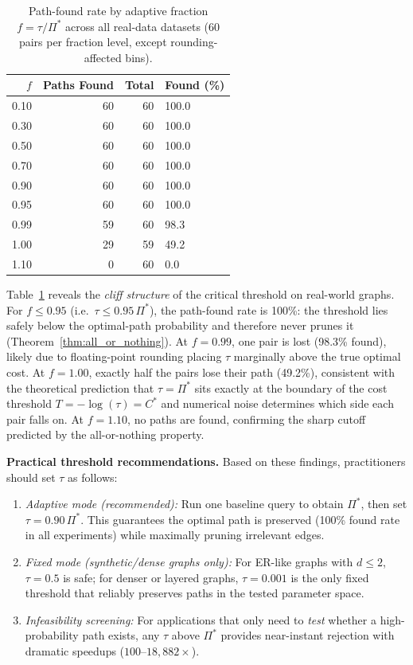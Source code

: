 \begin{table}[htbp]
\centering
\renewcommand{\arraystretch}{1.3}
\caption[Adaptive-$\tau$ path-found rate by fraction $f$]{Path-found rate by adaptive fraction $f = \tau / \Pi^*$ across all real-data datasets (60 pairs per fraction level, except rounding-affected bins).}
\label{table:adaptive_cliff}
\begin{tabular}{@{}rrrl@{}}
\toprule
$f$ & Paths Found & Total & Found (\%) \\
\midrule
0.10 & 60  & 60  & 100.0 \\
0.30 & 60  & 60  & 100.0 \\
0.50 & 60  & 60  & 100.0 \\
0.70 & 60  & 60  & 100.0 \\
0.90 & 60  & 60  & 100.0 \\
0.95 & 60  & 60  & 100.0 \\
0.99 & 59  & 60  & 98.3  \\
1.00 & 29  & 59  & 49.2  \\
1.10 &  0  & 60  &  0.0  \\
\bottomrule
\end{tabular}
\end{table}

Table~\ref{table:adaptive_cliff} reveals the \emph{cliff structure} of the critical threshold on real-world graphs. For $f \leq 0.95$ (i.e.\ $\tau \leq 0.95\,\Pi^*$), the path-found rate is 100\%: the threshold lies safely below the optimal-path probability and therefore never prunes it (Theorem~\ref{thm:all_or_nothing}). At $f = 0.99$, one pair is lost (98.3\% found), likely due to floating-point rounding placing $\tau$ marginally above the true optimal cost. At $f = 1.00$, exactly half the pairs lose their path (49.2\%), consistent with the theoretical prediction that $\tau = \Pi^*$ sits exactly at the boundary of the cost threshold $T = -\log(\tau) = C^*$ and numerical noise determines which side each pair falls on. At $f = 1.10$, no paths are found, confirming the sharp cutoff predicted by the all-or-nothing property.

\textbf{Practical threshold recommendations.}
Based on these findings, practitioners should set $\tau$ as follows:
\begin{enumerate}
  \item \emph{Adaptive mode (recommended):} Run one baseline query to obtain $\Pi^*$, then set $\tau = 0.90\,\Pi^*$. This guarantees the optimal path is preserved (100\% found rate in all experiments) while maximally pruning irrelevant edges.
  \item \emph{Fixed mode (synthetic/dense graphs only):} For ER-like graphs with $d \leq 2$, $\tau = 0.5$ is safe; for denser or layered graphs, $\tau = 0.001$ is the only fixed threshold that reliably preserves paths in the tested parameter space.
  \item \emph{Infeasibility screening:} For applications that only need to \emph{test} whether a high-probability path exists, any $\tau$ above $\Pi^*$ provides near-instant rejection with dramatic speedups ($100$--$18{,}882\times$).
\end{enumerate}

